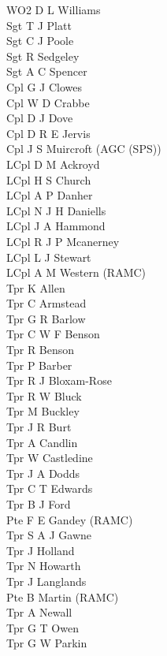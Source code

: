 \begin{multicols}{2}
  \noindent
  WO2 D L Williams \\
  Sgt T J Platt \\
  Sgt C J Poole \\
  Sgt R Sedgeley \\
  Sgt A C Spencer \\
  Cpl G J Clowes \\
  Cpl W D Crabbe \\
  Cpl D J Dove \\
  Cpl D R E Jervis \\
  Cpl J S Muircroft (AGC (SPS)) \\
  LCpl D M Ackroyd \\
  LCpl H S Church \\
  LCpl A P Danher \\
  LCpl N J H Daniells \\
  LCpl J A Hammond \\
  LCpl R J P Mcanerney \\
  LCpl L J Stewart \\
  LCpl A M Western (RAMC) \\
  Tpr K Allen \\
  Tpr C Armstead \\
  Tpr G R Barlow \\
  Tpr C W F Benson \\
  Tpr R Benson \\
  Tpr P Barber \\
  Tpr R J Bloxam-Rose \\
  Tpr R W Bluck \\
  Tpr M Buckley \\
  Tpr J R Burt \\
  Tpr A Candlin \\
  Tpr W Castledine \\
  Tpr J A Dodds \\
  Tpr C T Edwards \\
  Tpr B J Ford \\
  Pte F E Gandey (RAMC) \\
  Tpr S A J Gawne \\
  Tpr J Holland \\
  Tpr N Howarth \\
  Tpr J Langlands \\
  Pte B Martin (RAMC) \\
  Tpr A Newall \\
  Tpr G T Owen \\
  Tpr G W Parkin \\

\end{multicols}
